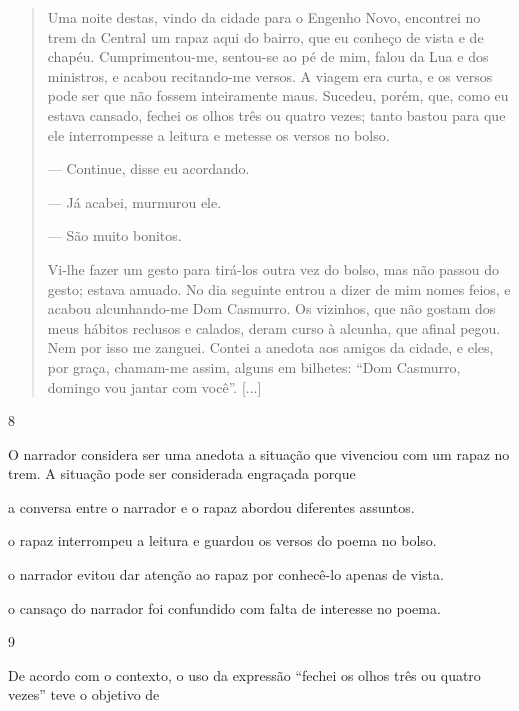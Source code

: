 \begin{quote}
Uma noite destas, vindo da cidade para o Engenho Novo, encontrei no trem
da Central um rapaz aqui do bairro, que eu conheço de vista e de chapéu.
Cumprimentou-me, sentou-se ao pé de mim, falou da Lua e dos ministros, e
acabou recitando-me versos. A viagem era curta, e os versos pode ser que
não fossem inteiramente maus. Sucedeu, porém, que, como eu estava
cansado, fechei os olhos três ou quatro vezes; tanto bastou para que ele
interrompesse a leitura e metesse os versos no bolso.

--- Continue, disse eu acordando.

--- Já acabei, murmurou ele.

--- São muito bonitos.

Vi-lhe fazer um gesto para tirá-los outra vez do bolso, mas não passou
do gesto; estava amuado. No dia seguinte entrou a dizer de mim nomes
feios, e acabou alcunhando-me Dom Casmurro. Os vizinhos, que não gostam
dos meus hábitos reclusos e calados, deram curso à alcunha, que afinal
pegou. Nem por isso me zanguei. Contei a anedota aos amigos da cidade, e
eles, por graça, chamam-me assim, alguns em bilhetes: ``Dom Casmurro,
domingo vou jantar com você''. {[}...{]}
\end{quote}


\num{8}

O narrador considera ser uma anedota a situação que vivenciou com um
rapaz no trem. A situação pode ser considerada engraçada porque

\begin{escolha}
\item a conversa entre o narrador e o rapaz abordou diferentes assuntos.

\item o rapaz interrompeu a leitura e guardou os versos do poema no bolso.

\item o narrador evitou dar atenção ao rapaz por conhecê-lo apenas de
vista.

\item o cansaço do narrador foi confundido com falta de interesse no poema.
\end{escolha}

\num{9}

De acordo com o contexto, o uso da expressão ``fechei os olhos três ou
quatro vezes'' teve o objetivo de

